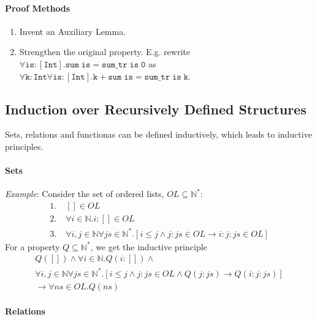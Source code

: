 \documentclass[10pt,twoside,twocolumn]{article}
\begin{document}
\paragraph{Proof Methods}
\begin{enumerate}
\item Invent an Auxiliary Lemma.
\item Strengthen the original property. E.g. rewrite $\forall\mathtt{is}:\mathtt{[Int]}.\mathtt{sum}\;\mathtt{is}=\mathtt{sum\_tr\;is\;0}$
as $\forall\mathtt{k}:\mathtt{Int}\forall\mathtt{is}:\mathtt{[Int]}.\mathtt{k}+\mathtt{sum}\;\mathtt{is}=\mathtt{sum\_tr\;is\;k}$.
\end{enumerate}

\subsection{Induction over Recursively Defined Structures}

Sets, relations and functionas can be defined inductively, which leads
to inductive principles.


\paragraph{Sets}

\emph{Example}: Consider the set of ordered lists, $OL\subseteq\mathbb{N}^{*}$:
\begin{align*}
1.\; & []\in OL\\
2.\; & \forall i\in\mathbb{N}.i:[]\in OL\\
3.\; & \forall i,j\in\mathbb{N}\forall js\in\mathbb{N}^{*}.\left[i\leq j\land j:js\in OL\rightarrow i:j:js\in OL\right]
\end{align*}
For a property $Q\subseteq\mathbb{N}^{*}$, we get the inductive principle
\begin{multline*}
Q\left([]\right)\land\forall i\in\mathbb{N}.Q\left(i:[]\right)\land\\
\forall i,j\in\mathbb{N}\forall js\in\mathbb{N}^{*}.\left[i\leq j\land j:js\in OL\land Q\left(j:js\right)\rightarrow Q\left(i:j:js\right)\right]\\
\rightarrow\forall ns\in OL.Q\left(ns\right)
\end{multline*}



\paragraph{Relations}
\end{document}
